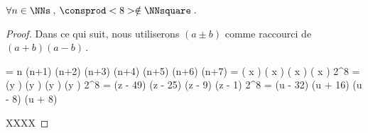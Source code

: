 \begin{fact} \label{case-8}
	 $\forall n \in \NNs$\,, $\consprod<8> \notin \NNsquare$\,.
\end{fact}




\begin{proof}
    Dans ce qui suit, nous utiliserons $(a \pm b)$ comme raccourci de $(a + b) (a - b)$\,.

    \begin{stepcalc}[style = ar*, ope = \iff]
    	 = 
			n (n+1) (n+2) (n+3) (n+4) (n+5) (n+6) (n+7)
    	\consprod<8> = 
			\big( x \pm {} \big) \big( x \pm {} \big) \big( x \pm {} \big) \big( x \pm {} \big) 
    	2^8 \consprod<8> = 
			(y ) (y ) (y ) (y )
    	2^8 \consprod<8> = 
			(z - 49) (z - 25) (z - 9) (z - 1) 
    	2^8 \consprod<8> = 
			(u - 32) (u + 16) (u - 8) (u + 8)
    \end{stepcalc}

    XXXX
\end{proof}

